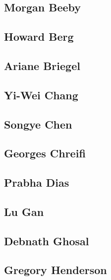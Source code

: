 \documentclass[]{tufte-book}
\begin{document}
\hypertarget{morgan_beeby}{\subsection{Morgan
Beeby}\label{morgan_beeby}}

\hypertarget{howard_berg}{\subsection{Howard Berg}\label{howard_berg}}

\hypertarget{ariane_briegel}{\subsection{Ariane
Briegel}\label{ariane_briegel}}

\hypertarget{yi-wei_chang}{\subsection{Yi-Wei
Chang}\label{yi-wei_chang}}

\hypertarget{songye_chen}{\subsection{Songye Chen}\label{songye_chen}}

\hypertarget{georges_chreifi}{\subsection{Georges
Chreifi}\label{georges_chreifi}}

\hypertarget{prabha_dias}{\subsection{Prabha Dias}\label{prabha_dias}}

\hypertarget{lu_gan}{\subsection{Lu Gan}\label{lu_gan}}

\hypertarget{debnath_ghosal}{\subsection{Debnath
Ghosal}\label{debnath_ghosal}}

\hypertarget{gregory_henderson}{\subsection{Gregory
Henderson}\label{gregory_henderson}}
\end{document}

